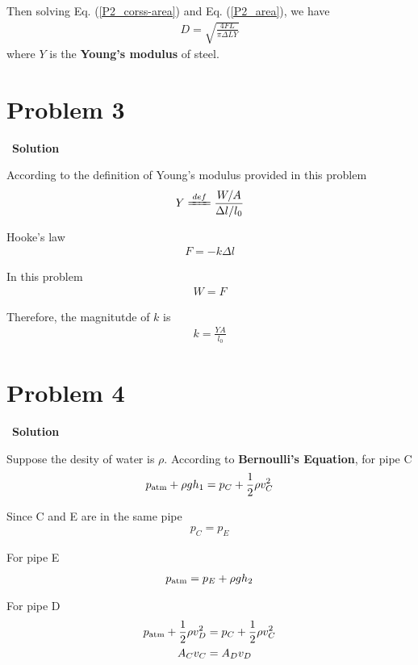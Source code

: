 \documentclass[12pt,a4paper]{article}
\begin{document}
Then solving Eq. (\ref{P2_corss-area}) and Eq. (\ref{P2_area}), we have
\begin{align}
	D = \sqrt{\frac{4FL}{\pi \Delta L Y}}
\end{align}
where $Y$ is the \textbf{Young's modulus} of steel.

\section*{\large \textbf{Problem 3}}~{\textbf{Solution}}

According to the definition of Young's modulus provided in this problem
\begin{align}
	Y \xlongequal{def} \frac{W/A}{\Delta l/l_0}
\end{align}

Hooke's law
\begin{align}
	F = -k\Delta l
\end{align}

In this problem
\begin{align}
	W = F
\end{align}

Therefore, the magnitutde of $k$ is
\begin{align}
	k = \frac{YA}{l_0}
\end{align}

\section*{\large \textbf{Problem 4}}~{\textbf{Solution}}

Suppose the desity of water is $\rho$. According to \textbf{Bernoulli's Equation}, for pipe C
\begin{align}
	p_{\rm atm} + \rho g h_1 = p_C + \frac{1}{2}\rho v_C ^2
\label{P4_Bernoulli's Equation_1}
\end{align}

Since C and E are in the same pipe
\begin{align}
	p_C = p_E
\label{P4_equilibrium}
\end{align}

For pipe E
\begin{align}
	p_{\rm atm} = p_E + \rho g h_2
\label{P4_Bernoulli's Equation_2}
\end{align}

For pipe D
\begin{align}
	p_{\rm atm} + \frac{1}{2}\rho v_D ^2 &= p_C + \frac{1}{2}\rho v_C ^2\\
	A_Cv_C &= A_Dv_D
\end{align}
\end{document}
